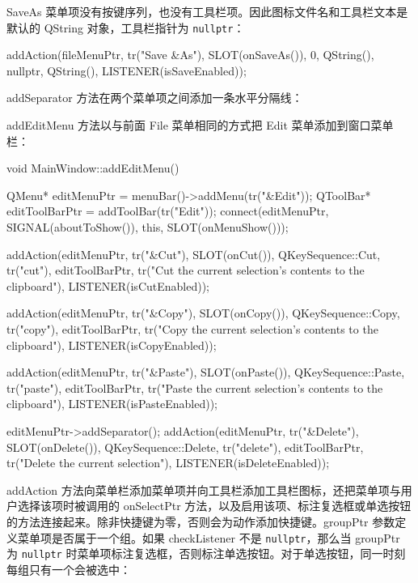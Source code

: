 SaveAs 菜单项没有按键序列，也没有工具栏项。因此图标文件名和工具栏文本是默认的 QString 对象，工具栏指针为 \texttt{nullptr}：

\begin{codebox}
  addAction(fileMenuPtr, tr("Save &As"), SLOT(onSaveAs()),
            0, QString(), nullptr, QString(),
            LISTENER(isSaveEnabled));
\end{codebox}

addSeparator 方法在两个菜单项之间添加一条水平分隔线：

\begin{codebox}
  fileMenuPtr->addSeparator();
  addAction(fileMenuPtr, tr("E&xit"),
            SLOT(onExit()), QKeySequence::Quit);
}
\end{codebox}

addEditMenu 方法以与前面 File 菜单相同的方式把 Edit 菜单添加到窗口菜单栏：

\begin{codebox}
void MainWindow::addEditMenu() {
  QMenu* editMenuPtr = menuBar()->addMenu(tr("&Edit"));
  QToolBar* editToolBarPtr = addToolBar(tr("Edit"));
  connect(editMenuPtr, SIGNAL(aboutToShow()),
          this, SLOT(onMenuShow()));

  addAction(editMenuPtr, tr("&Cut"), SLOT(onCut()),
            QKeySequence::Cut, tr("cut"), editToolBarPtr,
        tr("Cut the current selection's contents to the clipboard"),
            LISTENER(isCutEnabled));

  addAction(editMenuPtr, tr("&Copy"), SLOT(onCopy()),
            QKeySequence::Copy, tr("copy"), editToolBarPtr,
         tr("Copy the current selection's contents to the clipboard"),
            LISTENER(isCopyEnabled));

  addAction(editMenuPtr, tr("&Paste"),
            SLOT(onPaste()),
            QKeySequence::Paste, tr("paste"), editToolBarPtr,
        tr("Paste the current selection's contents to the clipboard"),
            LISTENER(isPasteEnabled));

  editMenuPtr->addSeparator();
  addAction(editMenuPtr, tr("&Delete"), SLOT(onDelete()),
            QKeySequence::Delete, tr("delete"), editToolBarPtr,
            tr("Delete the current selection"),
            LISTENER(isDeleteEnabled));
}
\end{codebox}

addAction 方法向菜单栏添加菜单项并向工具栏添加工具栏图标，还把菜单项与用户选择该项时被调用的 onSelectPtr 方法，以及启用该项、标注复选框或单选按钮的方法连接起来。除非快捷键为零，否则会为动作添加快捷键。groupPtr 参数定义菜单项是否属于一个组。如果 checkListener 不是 \texttt{nullptr}，那么当 groupPtr 为 \texttt{nullptr} 时菜单项标注复选框，否则标注单选按钮。对于单选按钮，同一时刻每组只有一个会被选中：

